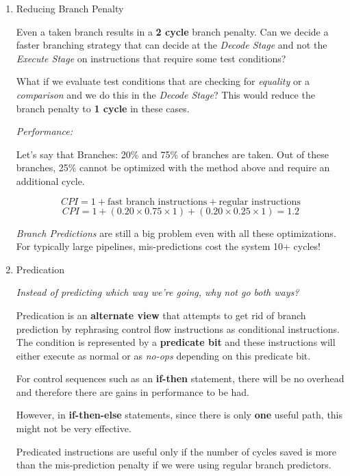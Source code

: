 \documentclass[12pt]{article}
\newenvironment{QandA}{\begin{enumerate}[label=\bfseries\arabic*.]\bfseries}
                      {\end{enumerate}}
\newenvironment{answered}{\par\quad\normalfont}{}
\begin{document}
\begin{QandA}
\begin{answered}
A \textbf{Hybrid Predictor} combines the above mentioned predictors and introduces a third component called the \textbf{chooser} which learns to predict which of the above two methods to use. This allows the correlated predictor to become smaller than previously defined and results in 90-95\% accuracy. 
\end{answered}

\item Reducing Branch Penalty
\begin{answered}
Even a taken branch results in a \textbf{2 cycle} branch penalty. Can we decide a faster branching strategy that can decide at the \textit{Decode Stage} and not the \textit{Execute Stage} on instructions that require some test conditions?

What if we evaluate test conditions that are checking for \textit{equality} or a \textit{comparison} and we do this in the \textit{Decode Stage}? This would reduce the branch penalty to \textbf{1 cycle} in these cases.

\textit{Performance:}

Let's say that Branches: 20\% and 75\% of branches are taken. Out of these branches, 25\% cannot be optimized with the method above and require an additional cycle.

\begin{equation*}
    CPI = 1 + \text{fast branch instructions} + \text{regular instructions}
\end{equation*}
\begin{equation*}
    CPI = 1 + (0.20 \times 0.75 \times 1) + (0.20 \times 0.25 \times 1) = 1.2
\end{equation*}

\textit{Branch Predictions} are still a big problem even with all these optimizations. For typically large pipelines, mis-predictions cost the system 10+ cycles!
\end{answered}

\item Predication
\begin{answered}
\textit{Instead of predicting which way we're going, why not go both ways?}

Predication is an \textbf{alternate view} that attempts to get rid of branch prediction by rephrasing control flow instructions as conditional instructions. The condition is represented by a \textbf{predicate bit} and these instructions will either execute as normal or as \textit{no-ops} depending on this predicate bit.

For control sequences such as an \textbf{if-then} statement, there will be no overhead and therefore there are gains in performance to be had. 

However, in \textbf{if-then-else} statements, since there is only \textbf{one} useful path, this might not be very effective. 

Predicated instructions are useful only if the number of cycles saved is more than the mis-prediction penalty if we were using regular branch predictors. 

\end{answered}

\end{QandA}
\end{document}
